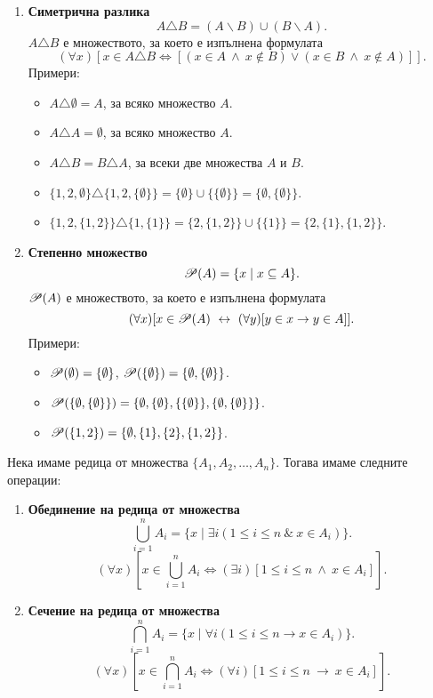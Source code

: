 \begin{enumerate}[{\bf (I)}]
\begin{itemize}
    \end{itemize}
  \item
    {\bf Симетрична разлика}
    \[A\triangle B = (A\backslash B)\cup (B\backslash A).\]
    $A\triangle B$ е множеството, за което е изпълнена формулата
    \[(\forall x)[x \in A\triangle B \iff [(x\in A\ \wedge\ x \not\in B) \vee (x \in B\ \wedge\ x\not\in A)]].\]
    Примери:
    \begin{itemize}
    \item 
      $A \triangle \emptyset = A$, за всяко множество $A$.
    \item
      $A \triangle A = \emptyset$, за всяко множество $A$.
    \item
      $A\triangle B = B \triangle A$, за всеки две множества $A$ и $B$.
    \item
      $\{1,2,\emptyset\} \triangle \{1,2,\{\emptyset\}\} = \{\emptyset\} \cup \{\{\emptyset\}\} = \{\emptyset,\{\emptyset\}\}$.
    \item
      $\{1,2,\{1,2\}\} \triangle \{1,\{1\}\} = \{2,\{1,2\}\} \cup \{\{1\}\} = \{2,\{1\},\{1,2\}\}$.
    \end{itemize}
  \item
    {\bf Степенно множество}
    \[\mathscr{P}(A) = \{x\mid x\subseteq A\}.\]
    $\mathscr{P}(A)$ е множеството, за което е изпълнена формулата
    \[(\forall x)[x \in \mathscr{P}(A) \ \leftrightarrow\  (\forall y)[y\in x\rightarrow y \in A]].\]
    Примери:
    \begin{itemize}
    \item 
      $\mathscr{P}(\emptyset) = \{\emptyset\}$, $\mathscr{P}(\{\emptyset\}) = \{\emptyset,\{\emptyset\}\}$.
    \item
      $\mathscr{P}(\{\emptyset,\{\emptyset\}\}) = \{\emptyset,\{\emptyset\},\{\{\emptyset\}\},\{\emptyset,\{\emptyset\}\}\}$.
    \item
      $\mathscr{P}(\{1,2\}) = \{\emptyset,\{1\},\{2\},\{1,2\}\}$.
    \end{itemize}
  \end{enumerate}
  Нека имаме редица от множества $\{A_1,A_2,\dots,A_n\}$.
  Тогава имаме следните операции:
  \begin{enumerate}[{\bf (I)}]
  \item
    {\bf Обединение на редица от множества}
    \[\bigcup^{n}_{i=1} A_i = \{x \mid \exists i (1\leq i\leq n\ \&\ x\in A_i)\}.\]
    \[(\forall x)[x \in \bigcup^n_{i=1}A_i \iff (\exists i)[1 \leq i \leq n\ \wedge\ x \in A_i]].\]
  \item
    {\bf Сечение на редица от множества}
    \[\bigcap^{n}_{i=1} A_i = \{x \mid \forall i (1\leq i\leq n \rightarrow x\in A_i)\}.\]
    \[(\forall x)[x \in \bigcap^n_{i=1}A_i \iff (\forall i)[1 \leq i \leq n\ \rightarrow\ x \in A_i]].\]
  \end{enumerate}

